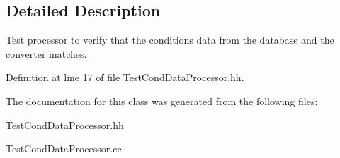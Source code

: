 \subsection{Detailed Description}
Test processor to verify that the conditions data from the database and the converter matches. 

Definition at line 17 of file TestCondDataProcessor.hh.

The documentation for this class was generated from the following files:\begin{DoxyCompactItemize}
\item 
TestCondDataProcessor.hh\item 
TestCondDataProcessor.cc\end{DoxyCompactItemize}
